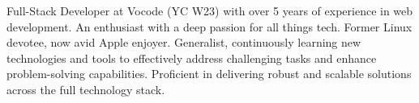 

\begin{cvparagraph}

Full-Stack Developer at Vocode (YC W23) with over 5 years of experience in web development. An enthusiast with a deep passion for all things tech. Former Linux devotee, now avid Apple enjoyer. Generalist, continuously learning new technologies and tools to effectively address challenging tasks and enhance problem-solving capabilities. Proficient in delivering robust and scalable solutions across the full technology stack.
\end{cvparagraph}
